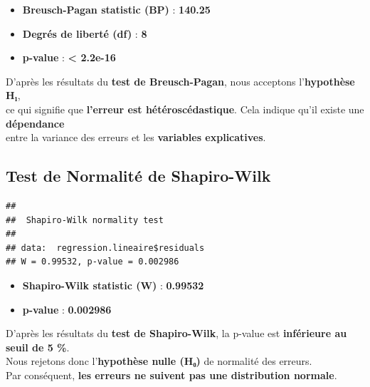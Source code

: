 \documentclass[
  12pt,
]{article}
\newenvironment{Shaded}{\begin{snugshade}}{\end{snugshade}}
\newcommand{\FunctionTok}[1]{\textcolor[rgb]{0.13,0.29,0.53}{\textbf{#1}}}
\newcommand{\NormalTok}[1]{#1}
\newcommand{\SpecialCharTok}[1]{\textcolor[rgb]{0.81,0.36,0.00}{\textbf{#1}}}
\providecommand{\tightlist}{%
  \setlength{\itemsep}{0pt}\setlength{\parskip}{0pt}}
\begin{document}
\begin{itemize}
\tightlist
\item
  \textbf{Breusch-Pagan statistic (BP)} : \textbf{140.25}\\
\item
  \textbf{Degrés de liberté (df)} : \textbf{8}\\
\item
  \textbf{p-value} : \textbf{\textless{} 2.2e-16}
\end{itemize}

D'après les résultats du \textbf{test de Breusch-Pagan}, nous acceptons
l'\textbf{hypothèse H₁},\\
ce qui signifie que \textbf{l'erreur est hétéroscédastique}. Cela
indique qu'il existe une \textbf{dépendance}\\
entre la variance des erreurs et les \textbf{variables explicatives}.

\subsection{Test de Normalité de
Shapiro-Wilk}\label{test-de-normalituxe9-de-shapiro-wilk}

\begin{Shaded}
\end{Shaded}

\begin{verbatim}
## 
##  Shapiro-Wilk normality test
## 
## data:  regression.lineaire$residuals
## W = 0.99532, p-value = 0.002986
\end{verbatim}

\begin{itemize}
\tightlist
\item
  \textbf{Shapiro-Wilk statistic (W)} : \textbf{0.99532}\\
\item
  \textbf{p-value} : \textbf{0.002986}
\end{itemize}

D'après les résultats du \textbf{test de Shapiro-Wilk}, la p-value est
\textbf{inférieure au seuil de 5 \%}.\\
Nous rejetons donc l'\textbf{hypothèse nulle (H₀)} de normalité des
erreurs.\\
Par conséquent, \textbf{les erreurs ne suivent pas une distribution
normale}.
\end{document}
